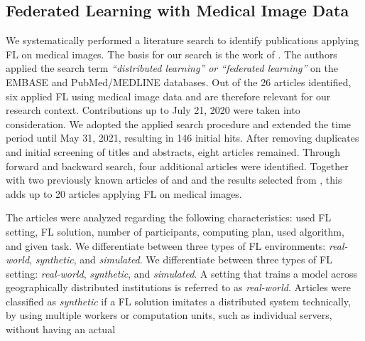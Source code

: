\subsection{Federated Learning with Medical Image Data}
\label{subsec:LitRev}

We systematically performed a literature search to identify publications applying FL on medical images. The basis for our search is the work of \cite{Kirienko2021DistributedAI}. The authors applied the search term \textit{``distributed learning'' or ``federated learning''} on the EMBASE and PubMed/MEDLINE databases. Out of the 26 articles identified, six applied FL using medical image data and are therefore relevant for our research context. Contributions up to July 21, 2020 were taken into consideration. We adopted the applied search procedure and extended the time period until May 31, 2021, resulting in 146 initial hits. After removing duplicates and initial screening of titles and abstracts, eight articles remained. Through forward and backward search, four additional articles were identified. Together with two previously known articles of \cite{Wang2020AutomatedLearning} and \cite{Roth2020FederatedImplementation} and the results selected from \cite{Kirienko2021DistributedAI}, this adds up to 20 articles applying FL on medical images.

The articles were analyzed regarding the following characteristics: used FL setting, FL solution, number of participants, computing plan, used algorithm, and given task. We differentiate between three types of FL environments: \textit{real-world}, \textit{synthetic}, and \textit{simulated}.  We differentiate between three types of FL setting: \textit{real-world}, \textit{synthetic}, and \textit{simulated}.
A setting that trains a model across geographically distributed institutions is referred to as \textit{real-world}.
Articles were classified as \textit{synthetic} if a FL solution imitates a distributed system technically, by using multiple workers or computation units, such as individual servers, without having an actual

